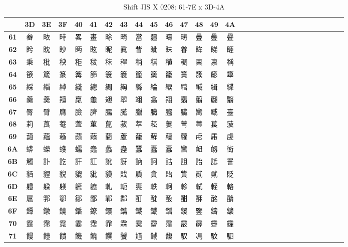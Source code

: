 \begin{table}[H]
\centering
\caption{Shift JIS X 0208: 61-7E x 3D-4A}
\begin{tabular}{|Sc|Sc|Sc|Sc|Sc|Sc|Sc|Sc|Sc|Sc|Sc|Sc|Sc|Sc|Sc|}
\hline
 & \textbf{3D} & \textbf{3E} & \textbf{3F} & \textbf{40} & \textbf{41} & \textbf{42} & \textbf{43} & \textbf{44} & \textbf{45} & \textbf{46} & \textbf{47} & \textbf{48} & \textbf{49} & \textbf{4A} \\ \hline
\textbf{61} & 畚 & 畩 & 畤 & 畧 & 畫 & 畭 & 畸 & 當 & 疆 & 疇 & 畴 & 疊 & 疉 & 疂 \\ \hline
\textbf{62} & 盻 & 眈 & 眇 & 眄 & 眩 & 眤 & 眞 & 眥 & 眦 & 眛 & 眷 & 眸 & 睇 & 睚 \\ \hline
\textbf{63} & 秉 & 秕 & 秧 & 秬 & 秡 & 秣 & 稈 & 稍 & 稘 & 稙 & 稠 & 稟 & 禀 & 稱 \\ \hline
\textbf{64} & 篏 & 箴 & 篆 & 篝 & 篩 & 簑 & 簔 & 篦 & 篥 & 籠 & 簀 & 簇 & 簓 & 篳 \\ \hline
\textbf{65} & 綵 & 緇 & 綽 & 綫 & 總 & 綢 & 綯 & 緜 & 綸 & 綟 & 綰 & 緘 & 緝 & 緤 \\ \hline
\textbf{66} & 羹 & 羮 & 羶 & 羸 & 譱 & 翅 & 翆 & 翊 & 翕 & 翔 & 翡 & 翦 & 翩 & 翳 \\ \hline
\textbf{67} & 臀 & 臂 & 膺 & 臉 & 臍 & 臑 & 臙 & 臘 & 臈 & 臚 & 臟 & 臠 & 臧 & 臺 \\ \hline
\textbf{68} & 莉 & 莨 & 菴 & 萓 & 菫 & 菎 & 菽 & 萃 & 菘 & 萋 & 菁 & 菷 & 萇 & 菠 \\ \hline
\textbf{69} & 藹 & 蘊 & 蘓 & 蘋 & 藾 & 藺 & 蘆 & 蘢 & 蘚 & 蘰 & 蘿 & 虍 & 乕 & 虔 \\ \hline
\textbf{6A} & 蟒 & 蠑 & 蠖 & 蠕 & 蠢 & 蠡 & 蠱 & 蠶 & 蠹 & 蠧 & 蠻 & 衄 & 衂 & 衒 \\ \hline
\textbf{6B} & 觸 & 訃 & 訖 & 訐 & 訌 & 訛 & 訝 & 訥 & 訶 & 詁 & 詛 & 詒 & 詆 & 詈 \\ \hline
\textbf{6C} & 貊 & 貍 & 貎 & 貔 & 豼 & 貘 & 戝 & 貭 & 貪 & 貽 & 貲 & 貳 & 貮 & 貶 \\ \hline
\textbf{6D} & 軆 & 躱 & 躾 & 軅 & 軈 & 軋 & 軛 & 軣 & 軼 & 軻 & 軫 & 軾 & 輊 & 輅 \\ \hline
\textbf{6E} & 扈 & 郛 & 鄂 & 鄒 & 鄙 & 鄲 & 鄰 & 酊 & 酖 & 酘 & 酣 & 酥 & 酩 & 酳 \\ \hline
\textbf{6F} & 鐔 & 鐓 & 鐃 & 鐇 & 鐐 & 鐶 & 鐫 & 鐵 & 鐡 & 鐺 & 鑁 & 鑒 & 鑄 & 鑛 \\ \hline
\textbf{70} & 霆 & 霈 & 霓 & 霎 & 霑 & 霏 & 霖 & 霙 & 霤 & 霪 & 霰 & 霹 & 霽 & 霾 \\ \hline
\textbf{71} & 饅 & 饐 & 饋 & 饑 & 饒 & 饌 & 饕 & 馗 & 馘 & 馥 & 馭 & 馮 & 馼 & 駟 \\ \hline

\end{tabular}
\end{table}
